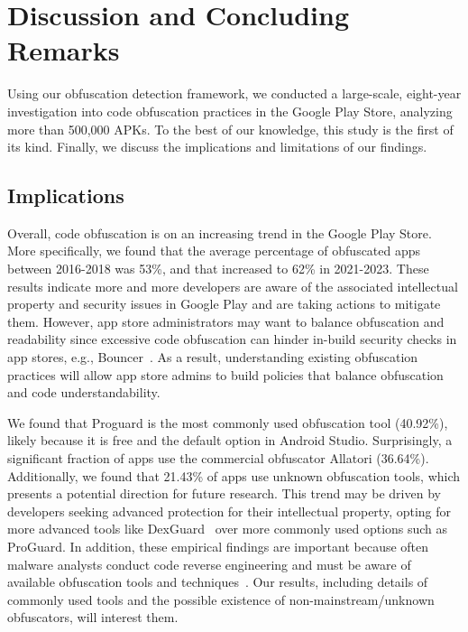 \section{Discussion and Concluding Remarks}
\label{sec:discussion}

Using our obfuscation detection framework, we conducted a large-scale, eight-year investigation into code obfuscation practices in the Google Play Store, analyzing more than 500,000 APKs. To the best of our knowledge, this study is the first of its kind. Finally, we discuss the implications and limitations of our findings.

\subsection{Implications}

 Overall, code obfuscation is on an increasing trend in the Google Play Store. More specifically, we found that the average percentage of obfuscated apps between 2016-2018 was 53\%, and that increased to 62\% in 2021-2023. These results indicate more and more developers are aware of the associated intellectual property and security issues in Google Play and are taking actions to mitigate them. However, app store administrators may want to balance obfuscation and readability since excessive code obfuscation can hinder in-build security checks in app stores, e.g., Bouncer~\cite{nawaz2022evaluation, bacci2018impact}. As a result, understanding existing obfuscation practices will allow app store admins to build policies that balance obfuscation and code understandability. \\ \vspace{-3mm}


 We found that Proguard is the most commonly used obfuscation tool (40.92\%), likely because it is free and the default option in Android Studio. Surprisingly, a significant fraction of apps use the commercial obfuscator Allatori (36.64\%). Additionally, we found that 21.43\% of apps use unknown obfuscation tools, which presents a potential direction for future research. This trend may be driven by developers seeking advanced protection for their intellectual property, opting for more advanced tools like DexGuard~\cite{dexguard} over more commonly used options such as ProGuard. In addition, these empirical findings are important because often malware analysts conduct code reverse engineering and must be aware of available obfuscation tools and techniques~\cite{zhang2021android, wang2017changed, kuhnel2015fast}. Our results, including details of commonly used tools and the possible existence of non-mainstream/unknown obfuscators, will interest them. \\ \vspace{-3mm}


